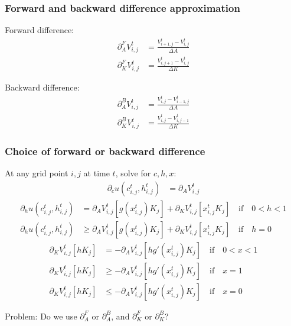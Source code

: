 \documentclass[aspectratio=169]{beamer}
\newenvironment{wideitemize}{\itemize\addtolength{\itemsep}{10pt}}{\enditemize}
\begin{document}
\begin{frame}
    \frametitle{Forward and backward difference approximation}

    \begin{wideitemize}
        \item Forward difference:
        \begin{align*}
            \partial_A^F V_{i,j}^t &= \frac{V_{i+1, j}^t - V_{i, j}^t}{\Delta A} \\
            \partial_K^F V_{i,j}^t &= \frac{V_{i, j+1}^t - V_{i, j}^t}{\Delta K}
        \end{align*}
        \item Backward difference:
        \begin{align*}
            \partial_A^B V_{i,j}^t &= \frac{V_{i, j}^t - V_{i-1, j}^t}{\Delta A} \\
            \partial_K^B V_{i,j}^t &= \frac{V_{i, j}^t - V_{i, j-1}^t}{\Delta K}
        \end{align*}
    \end{wideitemize}

\end{frame}

\begin{frame}
    \frametitle{Choice of forward or backward difference}

    \begin{wideitemize}
        \item At any grid point $i, j$ at time $t$, solve for $c, h, x$:
        \begin{align}
            \partial_c u(c_{i,j}^t, h_{i,j}^t) &= \partial_A V_{i,j}^t
        \end{align}
        \begin{align}
            \partial_h u(c_{i,j}^t, h_{i,j}^t) &= \partial_A V_{i,j}^t \left[ g(x_{i, j}^t) K_{j} \right] + \partial_K V_{i,j}^t \left[ x_{i, j}^t K_{j} \right] \quad \text{if} \quad 0 < h < 1 \\
            \partial_h u(c_{i,j}^t, h_{i,j}^t) &\geq \partial_A V_{i,j}^t \left[ g(x_{i, j}^t) K_{j} \right] + \partial_K V_{i,j}^t \left[ x_{i, j}^t K_{j} \right] \quad \text{if} \quad h = 0
        \end{align}
        \begin{align}
            \partial_K V_{i,j}^t \left[ h K_{j} \right] &= -\partial_A V_{i,j}^t \left[ h g'(x_{i, j}^t) K_{j} \right] \quad \text{if} \quad 0 < x < 1  \\
            \partial_K V_{i,j}^t \left[ h K_{j} \right] &\geq -\partial_A V_{i,j}^t \left[ h g'(x_{i, j}^t) K_{j} \right] \quad \text{if} \quad x = 1  \\
            \partial_K V_{i,j}^t \left[ h K_{j} \right] &\leq -\partial_A V_{i,j}^t \left[ h g'(x_{i, j}^t) K_{j} \right] \quad \text{if} \quad x = 0
        \end{align}
        \item Problem: Do we use $\partial_A^F$ or $\partial_A^B$, and $\partial_K^F$ or $\partial_K^B$?
    \end{wideitemize}

\end{frame}
\end{document}
